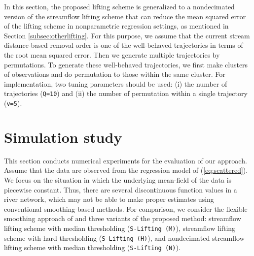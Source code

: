\documentclass[11pt,titlepage]{article}
\begin{document}
In this section, the proposed lifting scheme is generalized to a nondecimated version of the streamflow lifting scheme that can  reduce the mean squared error of the lifting scheme in nonparametric regression settings, as mentioned in Section \ref{subsec:otherlifting}. For this purpose, we assume that the current stream distance-based removal order is one of the well-behaved trajectories in terms of the root mean squared error. Then we generate multiple trajectories by permutations. To generate these well-behaved trajectories, we first make clusters of observations and do permutation to those within the same cluster. For implementation, two tuning parameters should be used: (i) the number of trajectories (\texttt{Q=10}) and (ii) the number of permutation within a single trajectory (\texttt{v=5}). %

\section{Simulation study}\label{sec:streamflowsimulationdata}

This section conducts numerical experiments for the evaluation of our approach. Assume that the data are observed from the regression model of (\ref{eq:scattered}). We focus on the situation in which the underlying mean-field of the data is piecewise constant. Thus, there are several discontinuous function values in a river network, which may not be able to make proper estimates using conventional smoothing-based methods. For comparison, we consider the flexible smoothing approach of \cite{ODonnell2014} and three variants of the proposed method: streamflow lifting scheme with median thresholding (\texttt{S-Lifting (M)}), streamflow lifting scheme with hard thresholding (\texttt{S-Lifting (H)}), and nondecimated streamflow lifting scheme with median thresholding (\texttt{S-Lifting (N)}).
\end{document}
